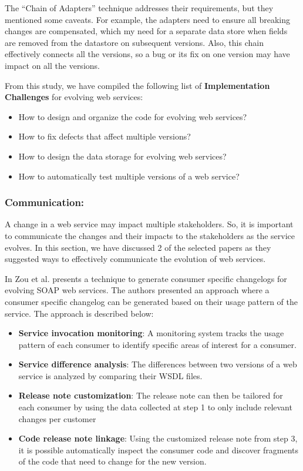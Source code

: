 \documentclass[runningheads,a4paper]{llncs}
\begin{document}
The ``Chain of Adapters'' technique addresses their requirements, but they mentioned some caveats. For example, the adapters need to ensure all breaking changes are compensated, which my need for a separate data store when fields are removed from the datastore on subsequent versions. Also, this chain effectively connects all the versions, so a bug or its fix on one version may have impact on all the versions.

From this study, we have compiled the following list of \textbf{Implementation Challenges} for evolving web services:

\begin{itemize}
  \item How to design and organize the code for evolving web services?
  \item How to fix defects that affect multiple versions?
  \item How to design the data storage for evolving web services?
  \item How to automatically test multiple versions of a web service?
\end{itemize}

\subsubsection{Communication:}
A change in a web service may impact multiple stakeholders. So, it is important to communicate the changes and their impacts to the stakeholders as the service evolves. In this section, we have discussed 2 of the selected papers as they suggested ways to effectively communicate the evolution of web services.

In \cite{le2008synchronizing} Zou et al. presents a technique to generate consumer specific changelogs for evolving SOAP web services. The authors presented an approach where a consumer specific changelog can be generated based on their usage pattern of the service. The approach is described below:

\begin{itemize}
  \item \textbf{Service invocation monitoring}: A monitoring system tracks the usage pattern of each consumer to identify specific areas of interest for a consumer.
  \item \textbf{Service difference analysis}: The differences between two versions of a web service is analyzed by comparing their WSDL files.
  \item \textbf{Release note customization}: The release note can then be tailored for each consumer by using the data collected at step 1 to only include relevant changes per customer
  \item \textbf{Code release note linkage}: Using the customized release note from step 3, it is possible automatically inspect the consumer code and discover fragments of the code that need to change for the new version.
\end{itemize}
\end{document}
